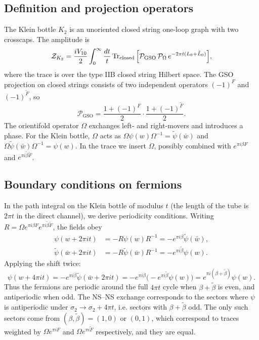 \documentclass[11pt,a4paper]{article}
\begin{document}
\subsection{Definition and projection operators}
The Klein bottle $K_2$ is an unoriented closed string one-loop graph with two crosscaps. The amplitude is
\begin{equation}
\mathcal{Z}_{K_2} = \frac{i V_{10}}{2} \int_0^\infty \frac{dt}{t} \Tr_{\mathrm{closed}} \Big[ \mathcal{P}_{\mathrm{GSO}} \, \mathcal{P}_\Omega \, e^{-2\pi t (L_0 + \tilde L_0)} \Big],
\end{equation}
where the trace is over the type IIB closed string Hilbert space. The GSO projection on closed strings consists of two independent operators $(-1)^F$ and $(-1)^{\tilde F}$, so
\begin{equation}
\mathcal{P}_{\mathrm{GSO}} = \frac{1+(-1)^F}{2} \cdot \frac{1+(-1)^{\tilde F}}{2}.
\end{equation}
The orientifold operator $\Omega$ exchanges left- and right-movers and introduces a phase. For the Klein bottle, $\Omega$ acts as $\Omega \psi(w) \Omega^{-1} = \tilde\psi(\bar w)$ and $\Omega \tilde\psi(\bar w) \Omega^{-1} = \psi(w)$. In the trace we insert $\Omega$, possibly combined with $e^{\pi i \beta F}$ and $e^{\pi i \tilde\beta \tilde F}$.

\subsection{Boundary conditions on fermions}
In the path integral on the Klein bottle of modulus $t$ (the length of the tube is $2\pi t$ in the direct channel), we derive periodicity conditions. Writing $R = \Omega e^{\pi i \beta F} e^{\pi i \tilde\beta \tilde F}$, the fields obey
\begin{align}
\psi(w + 2\pi i t) &= -R \psi(w) R^{-1} = -e^{\pi i \beta} \tilde\psi(\bar w), \\
\tilde\psi(\bar w + 2\pi i t) &= -R \tilde\psi(\bar w) R^{-1} = -e^{\pi i \tilde\beta} \psi(w).
\end{align}
Applying the shift twice:
\begin{equation}
\psi(w + 4\pi i t) = -e^{\pi i \beta} \tilde\psi(\bar w + 2\pi i t) = -e^{\pi i \beta} \big( -e^{\pi i \tilde\beta} \psi(w) \big) = e^{\pi i (\beta + \tilde\beta)} \psi(w).
\end{equation}
Thus the fermions are periodic around the full $4\pi t$ cycle when $\beta + \tilde\beta$ is even, and antiperiodic when odd. The NS–NS exchange corresponds to the sectors where $\psi$ is antiperiodic under $\sigma_2 \to \sigma_2 + 4\pi t$, i.e. sectors with $\beta + \tilde\beta$ odd. The only such sectors come from $(\beta,\tilde\beta) = (1,0)$ or $(0,1)$, which correspond to traces weighted by $\Omega e^{\pi i F}$ and $\Omega e^{\pi i \tilde F}$ respectively, and they are equal.
\end{document}
